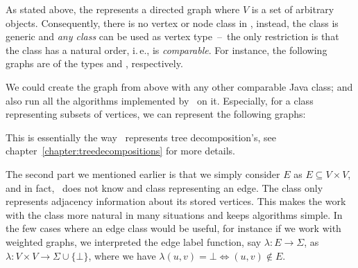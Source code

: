 \documentclass[a4paper, ukenglish, twoside, openright]{jdrasilmanual}
\begin{document}
As stated above, 
the  represents a directed graph where
$V$ is a set of arbitrary objects.  Consequently, there is no vertex
or node class in \Jdrasil, instead, the  class is
generic and \emph{any class} can be used as vertex type~–~the only
restriction is that the class has a natural order, i.\,e., is
\emph{comparable}. For instance, the following graphs are of the types
 and , respectively.
\begin{center}
\end{center}
We could create the graph from above with any other comparable Java
class; and also run all the algorithms implemented by \Jdrasil\ on
it. Especially, for a class representing subsets of vertices, we can
represent the following graphs:
\begin{center}
\end{center}
This is essentially the way \Jdrasil\ represents tree decomposition's,
see chapter~\ref{chapter:treedecompositions} for more details.

The second part we mentioned earlier is that we simply consider $E$ as
$E\subseteq V\times V$, and in fact, \Jdrasil\ does not know and class
representing an edge. The  class only represents
adjacency information about its stored vertices. This makes the work
with the  class more natural in many situations and
keeps algorithms simple. In the few cases where an edge class would be
useful, for instance if we work with weighted graphs, we interpreted
the edge label function, say $\lambda\colon E\rightarrow\Sigma$, as
$\lambda\colon V\times V\rightarrow\Sigma\cup\{\bot\}$, where we have
$\lambda(u,v)=\bot\Leftrightarrow (u,v)\not\in E$.
\end{document}
